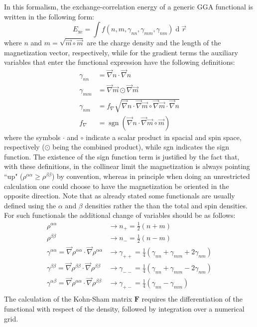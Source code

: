 \documentclass[12pt]{article}
\newcommand{\dd}{\operatorname{d}}
\newcommand*{\grad}{\vec{\nabla}}
\begin{document}
In this formalism, the exchange-correlation energy of a generic GGA functional is written in the following form:
\begin{equation}
\label{eq:Exc}
 E_\mathrm{xc} = \int f(n,m,\gamma_{nn},\gamma_{mm},\gamma_{nm})\dd\vec{r}
\end{equation}
where $n$ and $m=\sqrt{\vec{m}\circ\vec{m}}$ are the charge density and the length of the magnetization vector, respectively, while for the gradient terms the auxiliary variables that enter the functional expression have the following definitions:
\begin{equation}
\label{eq:Uvar}
\begin{split}
 \gamma_{nn} &= \grad n\cdot\grad n \\
 \gamma_{mm} &= \grad \vec{m}\odot\grad \vec{m} \\
 \gamma_{nm} &= f_\nabla\sqrt{\grad n\cdot\grad \vec{m}\circ\grad \vec{m}\cdot\grad n} \\
 f_\nabla    &= \operatorname{sgn}(\grad n\cdot\grad \vec{m}\circ\vec{m})
\end{split}
\end{equation}
where the symbols $\cdot$ and $\circ$ indicate a scalar product in spacial and spin space, respectively ($\odot$ being the combined product), while sgn indicates the sign function.
The existence of the sign function term is justified by the fact that, with these definitions, in the collinear limit the magnetization is always pointing ``up" ($\rho^{\alpha\alpha}\ge\rho^{\beta\beta}$) by convention, whereas in principle when doing an unrestricted calculation one could choose to have the magnetization be oriented in the opposite direction.
Note that as already stated some functionals are usually defined using the $\alpha$ and $\beta$ densities rather the than the total and spin densities.
For such functionals the additional change of variables should be as follows:
\begin{equation}
\label{eq:alphabeta}
\begin{split}
 \rho^{\alpha\alpha} &\longrightarrow n_+ = \frac{1}{2}(n + m) \\
 \rho^{\beta\beta}   &\longrightarrow n_- = \frac{1}{2}(n - m) \\
 \gamma^{\alpha\alpha} = \grad\rho^{\alpha\alpha}\cdot\grad\rho^{\alpha\alpha} 
  &\longrightarrow \gamma_{++} = \frac{1}{4}(\gamma_{nn} + \gamma_{mm} + 2\gamma_{nm}) \\
 \gamma^{\beta\beta} = \grad\rho^{\beta\beta}\cdot\grad\rho^{\beta\beta}
  &\longrightarrow \gamma_{--} = \frac{1}{4}(\gamma_{nn} + \gamma_{mm} - 2\gamma_{nm}) \\
 \gamma^{\alpha\beta} = \grad\rho^{\alpha\alpha}\cdot\grad\rho^{\beta\beta}
  &\longrightarrow \gamma_{+-} = \frac{1}{4}(\gamma_{nn} - \gamma_{mm}) \\
\end{split}
\end{equation}
The calculation of the Kohn-Sham matrix $\mathbf{F}$ requires the differentiation of the functional with respect of the density, followed by integration over a numerical grid.
\end{document}
